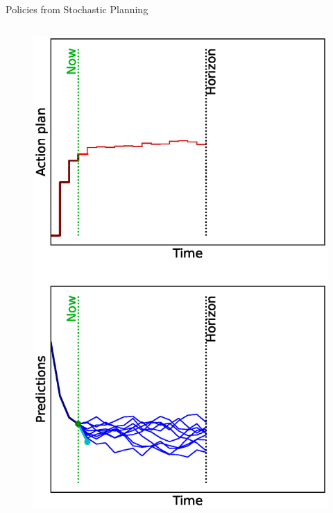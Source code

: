 \documentclass[lecture]{beamer}
\begin{document}
\begin{frame}{\normalsize Policies from Stochastic Planning}
\begin{columns}
\begin{overlayarea}{\textwidth}{0.9\textheight}
\begin{figure}
{          \includegraphics[width=\FS\textwidth,clip]{Codes/MPC/MPCMC3.eps}
        }%
        {%
}
\end{figure}
\end{overlayarea}
\end{columns}
\end{frame}
\end{document}
